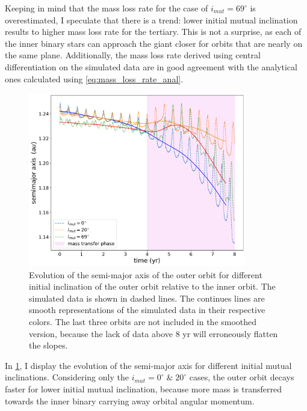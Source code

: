 Keeping in mind that the mass loss rate for the case of $i_{mut} = 69^{\circ}$ is overestimated, I speculate that there is a trend: lower initial mutual inclination results to higher mass loss rate for the tertiary. This is not a surprise, as each of the inner binary stars can approach the giant closer for orbits that are nearly on the same plane. Additionally, the mass loss rate derived using central differentiation on the simulated data are in good agreement with the analytical ones calculated using \cref{eq:mass_loss_rate_anal}.
\begin{figure}[H]
    \centering
    \includegraphics[width=0.85\textwidth]{Thesis/graphs/inclination_case/inclination_outer_semimajor_axis.pdf}
    \caption{Evolution of the semi-major axis of the outer orbit for different initial inclination of the outer orbit relative to the inner orbit. The simulated data is shown in dashed lines. The continues lines are smooth representations of the simulated data in their respective colors. The last three orbits are not included in the smoothed version, because the lack of data above $8$ yr will erroneously flatten the slopes.}
    \label{fig:inclination_outer_semimajor_axis}
\end{figure}
In \cref{fig:inclination_outer_semimajor_axis}, I display the evolution of the semi-major axis for different initial mutual inclinations. Considering only the $i_{mut} = 0^{\circ} \; \&  \; 20^{\circ}$ cases, the outer orbit decays faster for lower initial mutual inclination, because more mass is transferred towards the inner binary carrying away orbital angular momentum. 

